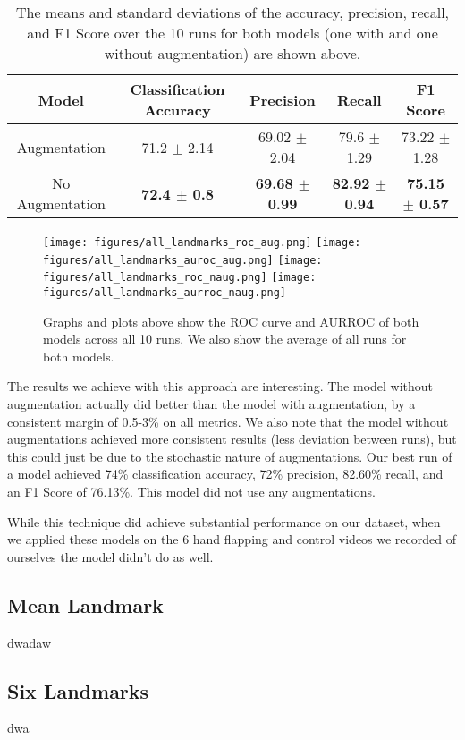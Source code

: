 \documentclass{article}
\begin{document}
\begin{table}[H]
    \centering
    \begin{tabular}{c|c|c|c|c}
    \hline 
    Model & Classification Accuracy & Precision & Recall & F1 Score \\ 
    \hline 
    Augmentation & 71.2 $\pm$ 2.14 & 69.02 $\pm$ 2.04 & 79.6 $\pm$ 1.29 & 73.22 $\pm$ 1.28 \\
    \hline
    No Augmentation & \textbf{72.4 $\pm$ 0.8} & \textbf{69.68 $\pm$ 0.99} & \textbf{82.92 $\pm$ 0.94} & \textbf{75.15 $\pm$ 0.57} \\ 
    \hline
    \end{tabular}
    \caption{The means and standard deviations of the accuracy, precision, recall, and F1 Score over the 10 runs for both models (one with and one without augmentation) are shown above.}
\end{table}

\begin{figure}[h!]
    \centering
    \texttt{[image: figures/all\_landmarks\_roc\_aug.png]}
    \texttt{[image: figures/all\_landmarks\_auroc\_aug.png]}
    \texttt{[image: figures/all\_landmarks\_roc\_naug.png]}
    \texttt{[image: figures/all\_landmarks\_aurroc\_naug.png]}
    \caption{Graphs and plots above show the ROC curve and AURROC of both models across all 10 runs. We also show the average of all runs for both models. }
    \label{fig:method}
\end{figure}

The results we achieve with this approach are interesting. The model  without augmentation actually did better than the model with augmentation, by a consistent margin of 0.5-3\% on all metrics. We also note that the model without augmentations achieved more consistent results (less deviation between runs), but this could just be due to the stochastic nature of augmentations. Our best run of a model achieved 74\% classification accuracy, 72\% precision, 82.60\% recall, and an F1 Score of 76.13\%. This model did not use any augmentations. 

While this technique did achieve substantial performance on our dataset, when we applied these models on the 6 hand flapping and control videos we recorded of ourselves the model didn't do as well. 

\subsection{Mean Landmark}
dwadaw
\subsection{Six Landmarks}
dwa



\end{document}
